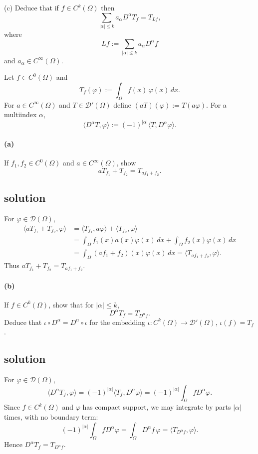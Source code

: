 \documentclass[12pt,a4paper]{article}
\theoremstyle{plain}
\theoremstyle{definition}
\theoremstyle{remark}
\theoremstyle{remark}
\begin{document}
\medskip\noindent
(c)\; Deduce that if $f\in C^k(\Omega)$ then
\[
\sum_{|\alpha|\le k} a_\alpha D^\alpha T_f = T_{Lf},
\]
where
\[
Lf := \sum_{|\alpha|\le k} a_\alpha D^\alpha f
\]
and $a_\alpha\in C^\infty(\Omega)$.

\bigskip


Let $f\in C^0(\Omega)$ and
\[
T_f(\varphi) := \int_\Omega f(x)\,\varphi(x)\,dx.
\]
For $a\in C^\infty(\Omega)$ and $T\in\mathcal{D}'(\Omega)$ define
$(aT)(\varphi):=T(a\varphi)$. For a multiindex $\alpha$,
\[
\langle D^\alpha T,\varphi\rangle
:= (-1)^{|\alpha|}\langle T,D^\alpha\varphi\rangle.
\]

\paragraph{(a)}
If $f_1,f_2\in C^0(\Omega)$ and $a\in C^\infty(\Omega)$, show
\[
aT_{f_1} + T_{f_2} = T_{af_1+f_2}.
\]

\subsection*{solution}
	For $\varphi\in\mathcal{D}(\Omega)$,
	\[
	\begin{aligned}
		\langle aT_{f_1}+T_{f_2},\varphi\rangle
		&= \langle T_{f_1},a\varphi\rangle + \langle T_{f_2},\varphi\rangle \\
		&= \int_\Omega f_1(x)a(x)\varphi(x)\,dx
		+ \int_\Omega f_2(x)\varphi(x)\,dx \\
		&= \int_\Omega (af_1 + f_2)(x)\varphi(x)\,dx
		= \langle T_{af_1+f_2},\varphi\rangle.
	\end{aligned}
	\]
	Thus $aT_{f_1}+T_{f_2}=T_{af_1+f_2}$.


\paragraph{(b)}
If $f\in C^k(\Omega)$, show that for $|\alpha|\le k$,
\[
D^\alpha T_f = T_{D^\alpha f}.
\]
Deduce that $\iota\circ D^\alpha = D^\alpha\circ\iota$ for the embedding
$\iota:C^k(\Omega)\to\mathcal{D}'(\Omega)$, $\iota(f)=T_f$.

\subsection*{solution}
	For $\varphi\in\mathcal{D}(\Omega)$,
	\[
	\langle D^\alpha T_f,\varphi\rangle
	= (-1)^{|\alpha|}\langle T_f,D^\alpha\varphi\rangle
	= (-1)^{|\alpha|}\int_\Omega f D^\alpha\varphi.
	\]
	Since $f\in C^k(\Omega)$ and $\varphi$ has compact support, we may
	integrate by parts $|\alpha|$ times, with no boundary term:
	\[
	(-1)^{|\alpha|}\int_\Omega f D^\alpha\varphi
	= \int_\Omega D^\alpha f\,\varphi
	= \langle T_{D^\alpha f},\varphi\rangle.
	\]
	Hence $D^\alpha T_f = T_{D^\alpha f}$.
	
\end{document}
